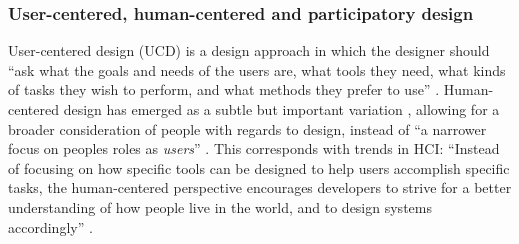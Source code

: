 \documentclass[letterpaper, 12pt]{article}
\begin{document}
\subsubsection{User-centered, human-centered and participatory design}
\label{ch3-sec:user-centered-design}

User-centered design (UCD) is a design approach in which the designer should ``ask what the goals and needs of the users are, what tools they need, what kinds of tasks they wish to perform, and what methods they prefer to use'' \citep[\citeauthor{Norman1988} \citeyear{Norman1988}, as cited in][p. 44]{El-shimy2014}. 
Human-centered design has emerged as a subtle but important variation \citep{Norman2013}, allowing for a broader consideration of people with regards to design, instead of ``a narrower focus on peoples roles as \emph{users}'' \citep[p. 45]{Steen2011}. This corresponds with trends in HCI: ``Instead of focusing on how specific tools can be designed to help users accomplish specific tasks, the human-centered perspective encourages developers to strive for a better understanding of how people live in the world, and to design systems accordingly'' \citep[p. 45]{El-shimy2014}. 
\end{document}
